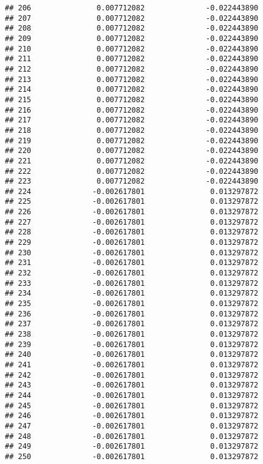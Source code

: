\documentclass[]{article}
\begin{document}
\begin{verbatim}
## 206               0.007712082              -0.022443890
## 207               0.007712082              -0.022443890
## 208               0.007712082              -0.022443890
## 209               0.007712082              -0.022443890
## 210               0.007712082              -0.022443890
## 211               0.007712082              -0.022443890
## 212               0.007712082              -0.022443890
## 213               0.007712082              -0.022443890
## 214               0.007712082              -0.022443890
## 215               0.007712082              -0.022443890
## 216               0.007712082              -0.022443890
## 217               0.007712082              -0.022443890
## 218               0.007712082              -0.022443890
## 219               0.007712082              -0.022443890
## 220               0.007712082              -0.022443890
## 221               0.007712082              -0.022443890
## 222               0.007712082              -0.022443890
## 223               0.007712082              -0.022443890
## 224              -0.002617801               0.013297872
## 225              -0.002617801               0.013297872
## 226              -0.002617801               0.013297872
## 227              -0.002617801               0.013297872
## 228              -0.002617801               0.013297872
## 229              -0.002617801               0.013297872
## 230              -0.002617801               0.013297872
## 231              -0.002617801               0.013297872
## 232              -0.002617801               0.013297872
## 233              -0.002617801               0.013297872
## 234              -0.002617801               0.013297872
## 235              -0.002617801               0.013297872
## 236              -0.002617801               0.013297872
## 237              -0.002617801               0.013297872
## 238              -0.002617801               0.013297872
## 239              -0.002617801               0.013297872
## 240              -0.002617801               0.013297872
## 241              -0.002617801               0.013297872
## 242              -0.002617801               0.013297872
## 243              -0.002617801               0.013297872
## 244              -0.002617801               0.013297872
## 245              -0.002617801               0.013297872
## 246              -0.002617801               0.013297872
## 247              -0.002617801               0.013297872
## 248              -0.002617801               0.013297872
## 249              -0.002617801               0.013297872
## 250              -0.002617801               0.013297872

\end{verbatim}
\end{document}
